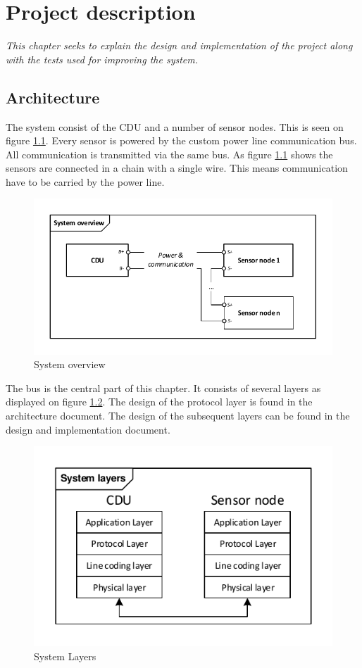 \chapter{Project description}
\textit{This chapter seeks to explain the design and implementation of the project along with the tests used for improving the system.}
\section{Architecture}
The system consist of the CDU and a number of sensor nodes. This is seen on figure \ref{fig:systembdd}. Every sensor is powered by the custom power line communication bus. All communication is transmitted via the same bus. As figure \ref{fig:systembdd} shows the sensors are connected in a chain with a single wire. This means communication have to be carried by the power line. 
\begin{figure}[H]
	\centering
	\includegraphics[width=.9\textwidth]{billeder/11ProjectDescription/systembdd}
	\caption{System overview}
	\label{fig:systembdd}
\end{figure}
The bus is the central part of this chapter. It consists of several layers as displayed on figure \ref{fig:systemlayers}. The design of the protocol layer is found in the architecture document. The design of the subsequent layers can be found in the design and implementation document.
\begin{figure}[H]
	\centering
	\includegraphics[width=.6\textwidth]{billeder/11ProjectDescription/System_Layers}
	\caption{System Layers}
	\label{fig:systemlayers}
\end{figure}
